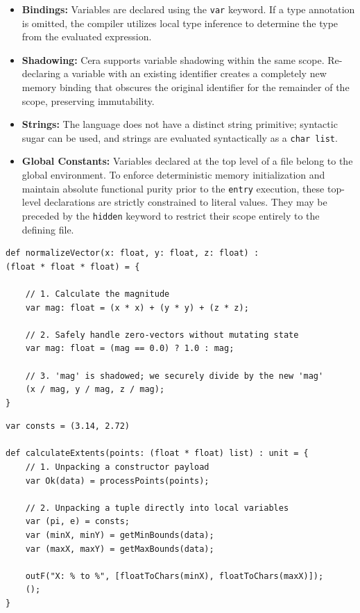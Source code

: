 \documentclass[11pt, a4paper]{article}
\begin{document}
\begin{itemize}
    \item \textbf{Bindings:} Variables are declared using the \texttt{var} keyword. If a type annotation is omitted, the compiler utilizes local type inference to determine the type from the evaluated expression.
    \item \textbf{Shadowing:} Cera supports variable shadowing within the same scope. Re-declaring a variable with an existing identifier creates a completely new memory binding that obscures the original identifier for the remainder of the scope, preserving immutability.
    \item \textbf{Strings:} The language does not have a distinct string primitive; syntactic sugar can be used, and strings are evaluated syntactically as a \texttt{char list}.
    \item \textbf{Global Constants:} Variables declared at the top level of a file belong to the global environment. To enforce deterministic memory initialization and maintain absolute functional purity prior to the \texttt{entry} execution, these top-level declarations are strictly constrained to literal values. They may be preceded by the \texttt{hidden} keyword to restrict their scope entirely to the defining file.
\end{itemize}

\begin{lstlisting}[language=Cera, title={Data Transformation via Shadowing}, basicstyle=\ttfamily]
def normalizeVector(x: float, y: float, z: float) : 
(float * float * float) = {
    
    // 1. Calculate the magnitude
    var mag: float = (x * x) + (y * y) + (z * z);
    
    // 2. Safely handle zero-vectors without mutating state
    var mag: float = (mag == 0.0) ? 1.0 : mag;
    
    // 3. 'mag' is shadowed; we securely divide by the new 'mag'
    (x / mag, y / mag, z / mag);
}
\end{lstlisting}

\begin{lstlisting}[language=Cera, title={Destructuring via Variable Declarations}, basicstyle=\ttfamily]
var consts = (3.14, 2.72)

def calculateExtents(points: (float * float) list) : unit = {
    // 1. Unpacking a constructor payload
    var Ok(data) = processPoints(points);
    
    // 2. Unpacking a tuple directly into local variables
    var (pi, e) = consts;
    var (minX, minY) = getMinBounds(data);
    var (maxX, maxY) = getMaxBounds(data);
    
    outF("X: % to %", [floatToChars(minX), floatToChars(maxX)]);
    ();
}
\end{lstlisting}
\end{document}
